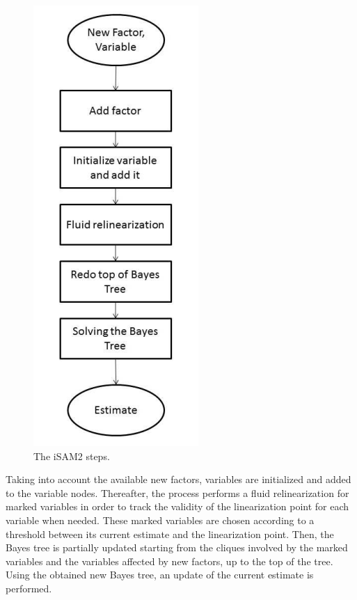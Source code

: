 \begin{figure}[H]
    \centering
    \includegraphics[scale=0.6]{assets/2_13.png}
    \caption{The iSAM2 steps.}
    \label{fig:2.13}
\end{figure}
Taking into account the available new factors, variables are initialized and added to the variable nodes. Thereafter, the process performs a ﬂuid relinearization for marked variables in order to track the validity of the linearization point for each variable when needed. These marked variables are chosen according to a threshold between its current estimate and the linearization point. Then, the Bayes tree is partially updated starting from the cliques involved by the marked variables and the variables aﬀected by new factors, up to the top of the tree. Using the obtained new Bayes tree, an update of the current estimate is performed.
